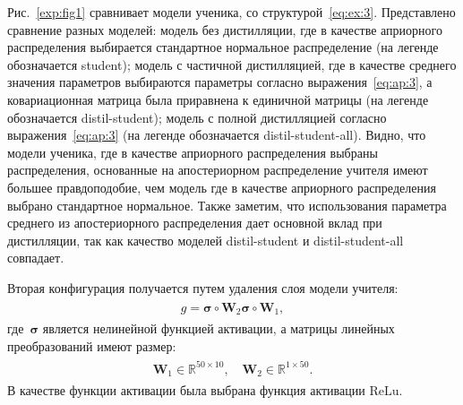 \documentclass[12pt]{a&t}
\begin{document}
Рис.~\ref{exp:fig1} сравнивает модели ученика, со структурой~\eqref{eq:ex:3}. Представлено сравнение разных моделей: модель без дистилляции, где в качестве априорного распределения выбирается стандартное нормальное распределение (на легенде обозначается student); модель с частичной дистилляцией, где в качестве среднего значения параметров выбираются параметры согласно выражения~\eqref{eq:ap:3}, а ковариационная матрица была приравнена к единичной матрицы (на легенде обозначается distil-student); модель с полной дистилляцией согласно выражения~\eqref{eq:ap:3} (на легенде обозначается distil-student-all). Видно, что модели ученика, где в качестве априорного распределения выбраны распределения, основанные на апостериорном распределение учителя имеют большее правдоподобие, чем модель где в качестве априорного распределения выбрано стандартное нормальное. Также заметим, что использования параметра среднего из апостериорного распределения дает основной вклад при дистилляции, так как качество моделей distil-student и distil-student-all совпадает.

Вторая конфигурация получается путем удаления слоя модели учителя:
\begin{gather}
\label{eq:ex:5}
\begin{aligned}
g = \bm{\sigma} \circ \mathbf{W}_2\bm{\sigma} \circ \mathbf{W}_1,
\end{aligned}
\end{gather}
где~$\bm{\sigma}$ является нелинейной функцией активации, а матрицы линейных преобразований имеют размер:
\begin{gather}
\label{eq:ex:6}
\begin{aligned}
\mathbf{W}_{1} \in \mathbb{R}^{50 \times 10}, \quad \mathbf{W}_{2} \in \mathbb{R}^{1 \times 50}.
\end{aligned}
\end{gather}
 В качестве функции активации была выбрана функция активации $\text{ReLu}$.
\end{document}
